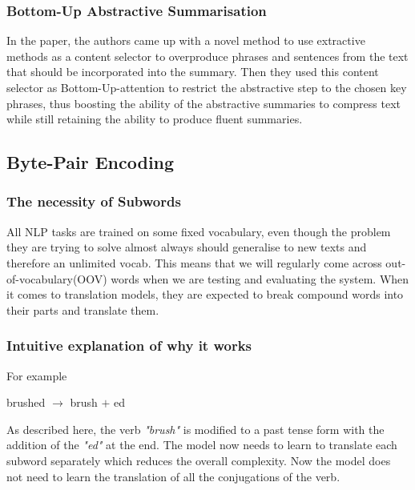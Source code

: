 \documentclass[12pt,a4paper,twoside,openright]{report}
\newcommand{\changedFont}[1]{{\fontfamily{qcr}\selectfont #1}}
\begin{document}
\subsubsection{Bottom-Up Abstractive Summarisation}
In the paper\cite{summary}, the authors came up with a novel method to use extractive methods as a content selector to overproduce phrases and sentences from the text that should be incorporated into the summary. Then they used this content selector as Bottom-Up-attention to restrict the abstractive step to the chosen key phrases, thus boosting the ability of the abstractive summaries to compress text while still retaining the ability to produce fluent summaries.

\subsection{Byte-Pair Encoding}
\label{bpe}

\subsubsection{The necessity of Subwords}
All NLP tasks are trained on some fixed vocabulary, even though the problem they are trying to solve almost always should generalise to new texts and therefore an unlimited vocab. This means that we will regularly come across out-of-vocabulary(OOV) words when we are testing and evaluating the system. When it comes to translation models, they are expected to break compound words into their parts and translate them.

\subsubsection{Intuitive explanation of why it works}
For example
\begin{center}
    \changedFont{brushed} $\longrightarrow$ \changedFont{brush $+$ ed}
\end{center}
As described here, the verb \textit{"brush"} is modified to a past tense form with the addition of the \textit{"ed"} at the end.
The model now needs to learn to translate each subword separately which reduces the overall complexity. Now the model does not need to learn the translation of all the conjugations of the verb.
\end{document}
